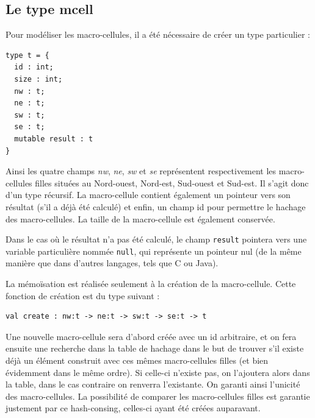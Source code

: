 \documentclass[a4paper,12pt]{report}
\begin{document}
\subsection*{Le type mcell}

Pour modéliser les macro-cellules, il a été nécessaire de créer un type
particulier : 
\begin{verbatim}
type t = { 
  id : int; 
  size : int; 
  nw : t; 
  ne : t; 
  sw : t; 
  se : t; 
  mutable result : t 
}
\end{verbatim}

Ainsi les quatre champs \textit{nw}, \textit{ne}, \textit{sw} et \textit{se}
représentent respectivement les macro-cellules filles situées au Nord-ouest,
Nord-est, Sud-ouest et Sud-est. Il s'agit donc d'un type récursif. La
macro-cellule contient également un pointeur vers son résultat (s'il a déjà été
calculé) et enfin, un champ id pour permettre le hachage des
macro-cellules. La taille de la macro-cellule est également conservée.

Dans le cas où le résultat n'a pas été calculé, le champ \texttt{result}
pointera vers une variable particulière nommée \texttt{null}, qui représente un
pointeur nul (de la même manière que dans d'autres langages, tels que C ou Java).

\medskip


La mémoïsation est réalisée seulement à la création de la
macro-cellule. Cette fonction de création est du type suivant :
\begin{verbatim}
val create : nw:t -> ne:t -> sw:t -> se:t -> t
\end{verbatim}

Une nouvelle macro-cellule sera d'abord créée avec un id arbitraire, et on fera
ensuite une recherche dans la table de hachage dans le but de trouver s'il
existe déjà un élément construit avec ces mêmes macro-cellules filles (et bien
évidemment dans le même ordre). Si celle-ci n'existe pas, on l'ajoutera alors
dans la table, dans le cas contraire on renverra l'existante. On garanti ainsi
l'unicité des macro-cellules. La possibilité de comparer les macro-cellules
filles est garantie justement par ce hash-consing, celles-ci ayant été créées
auparavant. 
\end{document}
